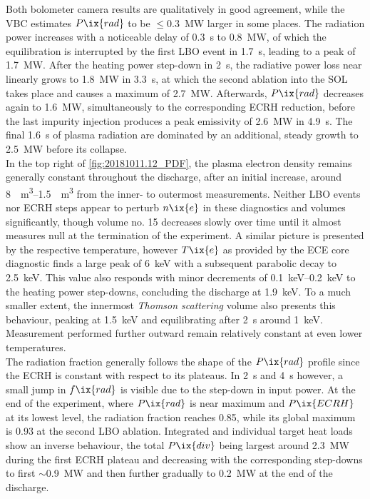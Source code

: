             Both bolometer camera results are qualitatively in good agreement, while the VBC estimates $P\ix{rad}$ to be $\le$\SI{0.3}{\mega\watt} larger in some places. The radiation power increases with a noticeable delay of \SI{0.3}{\second} to \SI{0.8}{\mega\watt}, of which the equilibration is interrupted by the first LBO event in \SI{1.7}{\second}, leading to a peak of \SI{1.7}{\mega\watt}. After the heating power step-down in \SI{2}{\second}, the radiative power loss near linearly grows to \SI{1.8}{\mega\watt} in \SI{3.3}{\second}, at which the second ablation into the SOL takes place and causes a maximum of \SI{2.7}{\mega\watt}. Afterwards, $P\ix{rad}$ decreases again to \SI{1.6}{\mega\watt}, simultaneously to the corresponding ECRH reduction, before the last impurity injection produces a peak emissivity of \SI{2.6}{\mega\watt} in \SI{4.9}{\second}. The final \SI{1.6}{\second} of plasma radiation are dominated by an additional, steady growth to \SI{2.5}{\mega\watt} before its collapse.\\%
            In the top right of \cref{fig:20181011.12_PDF}, the plasma electron density remains generally constant throughout the discharge, after an initial increase, around \SIrange{8}{1.5}{\per\cubic\meter} from the inner- to outermost measurements. Neither LBO events nor ECRH steps appear to perturb $n\ix{e}$ in these diagnostics and volumes significantly, though volume no. 15 decreases slowly over time until it almost measures null at the termination of the experiment. A similar picture is presented by the respective temperature, however $T\ix{e}$ as provided by the ECE core diagnostic finds a large peak of \SI{6}{\kilo\electronvolt} with a subsequent parabolic decay to \SI{2.5}{\kilo\electronvolt}. This value also responds with minor decrements of \SIrange{0.1}{0.2}{\kilo\electronvolt} to the heating power step-downs, concluding the discharge at \SI{1.9}{\kilo\electronvolt}. To a much smaller extent, the innermost \textit{Thomson scattering} volume also presents this behaviour, peaking at \SI{1.5}{\kilo\electronvolt} and equilibrating after \SI{2}{\second} around \SI{1}{\kilo\electronvolt}. Measurement performed further outward remain relatively constant at even lower temperatures.\\%
            The radiation fraction generally follows the shape of the $P\ix{rad}$ profile since the ECRH is constant with respect to its plateaus. In \SI{2}{\second} and \SI{4}{\second} however, a small jump in $f\ix{rad}$ is visible due to the step-down in input power. At the end of the experiment, where $P\ix{rad}$ is near maximum and $P\ix{ECRH}$ at its lowest level, the radiation fraction reaches \SI{0.85}{\arbitraryunit}, while its global maximum is \SI{0.93}{\arbitraryunit} at the second LBO ablation. Integrated and individual target heat loads show an inverse behaviour, the total $P\ix{div}$ being largest around \SI{2.3}{\mega\watt} during the first ECRH plateau and decreasing with the corresponding step-downs to first $\sim$\SI{0.9}{\mega\watt} and then further gradually to \SI{0.2}{\mega\watt} at the end of the discharge.\\%
